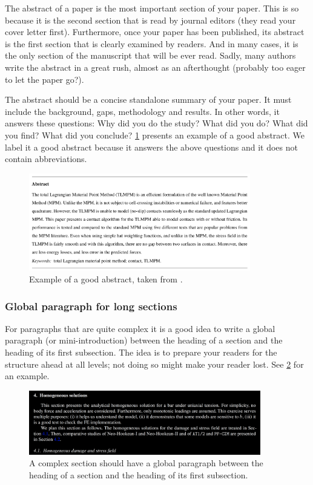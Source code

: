 \documentclass[authoryear,12pta4paper,fleqn]{article}
\numberwithin{equation}{section}
\theoremstyle{remark}
\begin{document}
The abstract of a paper is the most important section of your paper. This is so because it is the second section that is read by journal editors (they read your cover letter first). Furthermore, once your paper has been published, its abstract is the first section that is clearly examined by readers. And in many cases, it is the only section of the manuscript that will be ever read. Sadly, many authors write the abstract in a great rush, almost as an afterthought (probably too eager to let the paper go?).

The abstract should be a concise standalone summary of your paper. It must include the background, gaps, methodology and results. In other words, it answers these questions: Why did you do the study? What did you do?  What did you find? What did you conclude? \cref{fig:abstract} presents an example of a good abstract. We label it a good abstract because it answers the above questions and it does not contain abbreviations.

\begin{figure}[h!]
\centering
\includegraphics[width=0.86\textwidth]{abstract}
\caption{Example of a good abstract, taken from \cite{Ambati:CMAME2016a}.}
\label{fig:abstract}
\end{figure}


\subsubsection{Global paragraph for long sections}\label{sec:global-para}

For paragraphs that are quite complex it is a good idea to write a global paragraph (or mini-introduction) between the heading of a section and the heading of its first subsection. The idea is  to prepare your readers for the structure ahead at all levels; not doing so might make your reader lost. See \cref{fig:section} for an example. 


\begin{figure}[!h]
  \centering
  \includegraphics[width=0.9\textwidth]{section}
  \caption{A complex section should have a global paragraph between the heading of a section and the heading of its first subsection.}
  \label{fig:section}
\end{figure}
\end{document}
